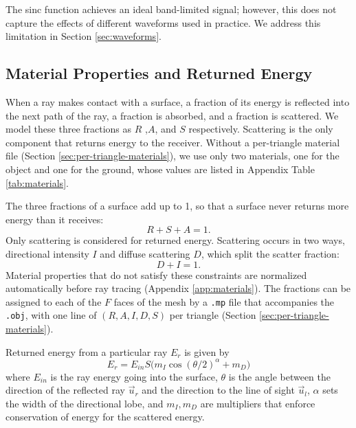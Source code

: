 \documentclass[sensors,article,submit,moreauthors]{Definitions/mdpi}
\begin{document}
The sinc function achieves an ideal band-limited signal; however, this does not capture the effects of different waveforms used in practice. We address this limitation in Section \ref{sec:waveforms}.


\subsection{Material Properties and Returned Energy}
\label{sec:material-properties}

When a ray makes contact with a surface, a fraction of its energy is reflected into the next path of the ray, a fraction is absorbed, and a fraction is scattered. We model these three fractions as $R$ ,$A$, and $S$ respectively. Scattering is the only component that returns energy to the receiver. Without a per-triangle material file (Section \ref{sec:per-triangle-materials}), we use only two materials, one for the object and one for the ground, whose values are listed in Appendix Table \ref{tab:materials}.

The three fractions of a surface add up to 1, so that a surface never returns more energy than it receives:
\begin{equation}
    R+S+A = 1
    .
\end{equation}
Only scattering is considered for returned energy. Scattering occurs in two ways, directional
intensity $I$ and diffuse scattering $D$, which split the scatter fraction:
\begin{equation}
    D + I = 1
    .
\end{equation}
Material properties that do not satisfy these constraints are normalized automatically before ray tracing (Appendix \ref{app:materials}). The fractions can be assigned to each of the $F$ faces of the mesh by a \texttt{.mp} file that accompanies the \texttt{.obj}, with one line of $(R,A,I,D,S)$ per triangle (Section \ref{sec:per-triangle-materials}).

Returned energy from a particular ray $E_r$ is given by
\begin{equation}
    E_r = E_{in} S \Big(m_I\cos({\theta/2})^\alpha + m_D\Big)
\end{equation}
where $E_{in}$ is the ray energy going into the surface, $\theta$ is the angle between the direction of the reflected ray $\vec{u}_r$ and the direction to the line of sight $\vec{u}_l$, $\alpha$ sets the width of the directional lobe, and $m_I,m_D$ are multipliers that enforce conservation of energy for the scattered energy.
\end{document}
